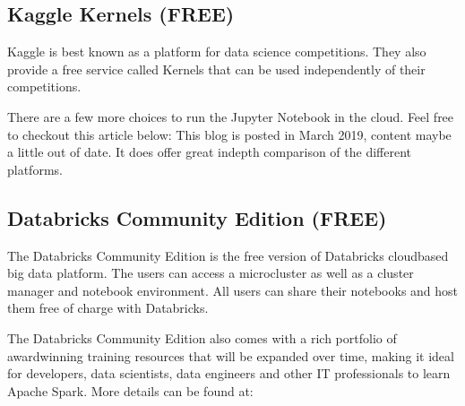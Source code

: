 \documentclass[letterpaper,12pt,english]{sphinxmanual}
\begin{document}
\begin{figure}[htbp]
\centering

\noindent{}
\end{figure}


\subsection{Kaggle Kernels (FREE)}
\label{\detokenize{install:kaggle-kernels-free}}
\sphinxAtStartPar
Kaggle is best known as a platform for data science competitions.
They also provide a free service called Kernels that can be used independently
of their competitions.

\begin{figure}[htbp]
\centering

\noindent{}
\end{figure}

\sphinxAtStartPar
There are a few more choices to run the Jupyter Notebook in the cloud. Feel
free to checkout this article below:
This blog is posted in March 2019, content maybe a little out of date.
It does offer great in\sphinxhyphen{}depth comparison of the different platforms.


\subsection{Databricks Community Edition (FREE)}
\label{\detokenize{install:databricks-community-edition-free}}
\sphinxAtStartPar
The Databricks Community Edition is the free version of Databricks cloud\sphinxhyphen{}based
big data platform. The users can access a micro\sphinxhyphen{}cluster as well as a cluster
manager and notebook environment. All users can share their notebooks and
host them free of charge with Databricks.

\sphinxAtStartPar
The Databricks Community Edition also comes with a rich portfolio of
award\sphinxhyphen{}winning training resources that will be expanded over time, making
it ideal for developers, data scientists, data engineers and other IT
professionals to learn Apache Spark. More details can be found at:

\begin{figure}[htbp]
\centering

\noindent{}
\end{figure}
\end{document}
